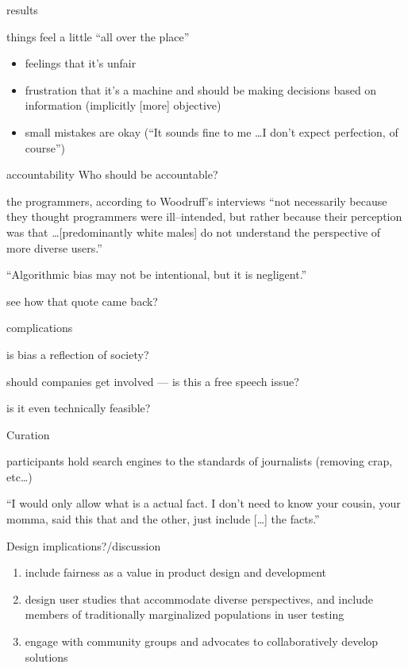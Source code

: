 \documentclass[aspectratio=169,12pt]{beamer} %
\begin{document}
\begin{frame}{results}

things feel a little ``all over the place''

\begin{itemize}
  \item feelings that it's unfair
  \item frustration that it's a machine and should be making decisions based on information (implicitly [more] objective)
  \item small mistakes are okay {\footnotesize (``It sounds fine to me \dots I don't expect perfection, of course'')}
\end{itemize}


\end{frame}

\begin{frame}{accountability}
    Who should be accountable?

    \alert{the programmers}, according to Woodruff's interviews ``not necessarily because they thought programmers were ill--intended, but rather because their perception was that \dots [predominantly white males] do not understand the perspective of more diverse users.''

    ``Algorithmic bias may not be intentional, but it is negligent.''

    {\footnotesize see how that quote came back?}


\end{frame}

\begin{frame}{complications}

is bias a reflection of society?

should companies get involved --- is this a free speech issue?

is it even technically feasible?

\end{frame}

\begin{frame}{Curation}
    
participants hold search engines to the standards of journalists (removing crap, etc\dots)

{\footnotesize ``I would only allow what is a actual fact. I don't need to know your cousin, your momma, said this that and the other, just include [\dots] the facts.''}

\end{frame}


\begin{frame}{Design implications?/discussion}

\begin{enumerate}
  \item include fairness as a value in product design and development
  \item design user studies that accommodate diverse perspectives, and include members of traditionally marginalized populations in user testing
  \item engage with community groups and advocates to collaboratively develop solutions
\end{enumerate}

\end{frame}
\end{document}
